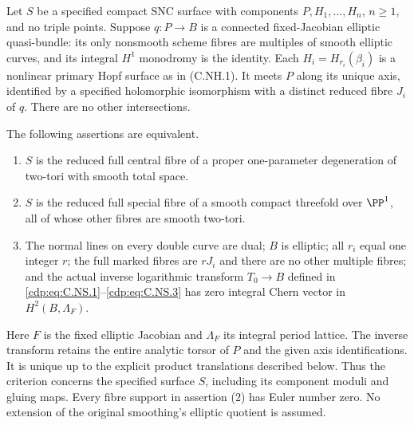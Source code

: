 
\begin{proposition}\label{cdp:st:C.2.UN.49}
Let $S$ be a specified compact SNC surface with components
$P,H_1,\ldots,H_n$, $n\ge1$, and no triple points. Suppose
$q:P\to B$ is a connected fixed-Jacobian elliptic quasi-bundle:
its only nonsmooth scheme fibres are multiples of smooth
elliptic curves, and its integral $H^1$ monodromy is the
identity. Each $H_i=H_{r_i}(\beta_i)$ is a nonlinear primary
Hopf surface as in (C.NH.1). It meets $P$ along its unique
axis, identified by a specified holomorphic isomorphism
with a distinct reduced fibre $J_i$ of $q$. There are no
other intersections.

The following assertions are equivalent.

\begin{enumerate}
\item $S$ is the reduced full central fibre of a proper
one-parameter degeneration of two-tori with smooth total space.
\item $S$ is the reduced full special fibre of a smooth compact
threefold over $\PP^1$, all of whose other fibres are smooth
two-tori.
\item The normal lines on every double curve are dual;
$B$ is elliptic; all $r_i$ equal one integer $r$; the full
marked fibres are $rJ_i$ and there are no other multiple
fibres; and the actual inverse logarithmic transform
$T_0\to B$ defined in \eqref{cdp:eq:C.NS.1}--\eqref{cdp:eq:C.NS.3} has zero integral
Chern vector in $H^2(B,\Lambda_F)$.
\end{enumerate}

Here $F$ is the fixed elliptic Jacobian and $\Lambda_F$ its
integral period lattice. The inverse transform retains
the entire analytic torsor of $P$ and the given axis
identifications. It is unique up to the explicit product
translations described below. Thus the criterion concerns
the specified surface $S$, including its component
moduli and gluing maps. Every fibre support in assertion
(2) has Euler number zero. No extension of the original
smoothing's elliptic quotient is assumed.
\end{proposition}

